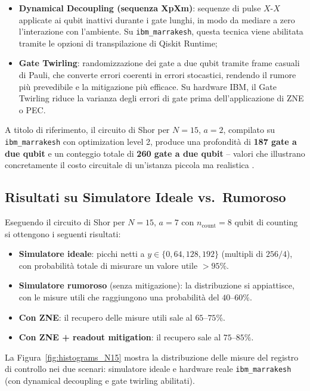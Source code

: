 \begin{onehalfspace}
\begin{itemize}
    \item \textbf{Dynamical Decoupling (sequenza XpXm)}: sequenze di pulse $X$-$X$ applicate ai qubit inattivi durante i gate lunghi, in modo da mediare a zero l'interazione con l'ambiente. Su \texttt{ibm\_marrakesh}, questa tecnica viene abilitata tramite le opzioni di transpilazione di Qiskit Runtime;
    \item \textbf{Gate Twirling}: randomizzazione dei gate a due qubit tramite frame casuali di Pauli, che converte errori coerenti in errori stocastici, rendendo il rumore più prevedibile e la mitigazione più efficace. Su hardware IBM, il Gate Twirling riduce la varianza degli errori di gate prima dell'applicazione di ZNE o PEC.
\end{itemize}

A titolo di riferimento, il circuito di Shor per $N=15$, $a=2$, compilato su \texttt{ibm\_marrakesh} con optimization level 2, produce una profondità di \textbf{187 gate a due qubit} e un conteggio totale di \textbf{260 gate a due qubit} -- valori che illustrano concretamente il costo circuitale di un'istanza piccola ma realistica \cite{ibm_shor_tutorial}.

\subsection{Risultati su Simulatore Ideale vs.\ Rumoroso}

Eseguendo il circuito di Shor per $N = 15$, $a = 7$ con $n_{\text{count}} = 8$ qubit di counting si ottengono i seguenti risultati:

\begin{itemize}
    \item \textbf{Simulatore ideale}: picchi netti a $y \in \{0, 64, 128, 192\}$ (multipli di $256/4$), con probabilità totale di misurare un valore utile $> 95\%$.
    \item \textbf{Simulatore rumoroso} (senza mitigazione): la distribuzione si appiattisce, con le misure utili che raggiungono una probabilità del $40$--$60\%$.
    \item \textbf{Con ZNE}: il recupero delle misure utili sale al $65$--$75\%$.
    \item \textbf{Con ZNE + readout mitigation}: il recupero sale al $75$--$85\%$.
\end{itemize}

La Figura~\ref{fig:histograms_N15} mostra la distribuzione delle misure del registro di controllo nei due scenari: simulatore ideale e hardware reale \texttt{ibm\_marrakesh} (con dynamical decoupling e gate twirling abilitati).


\end{onehalfspace}
